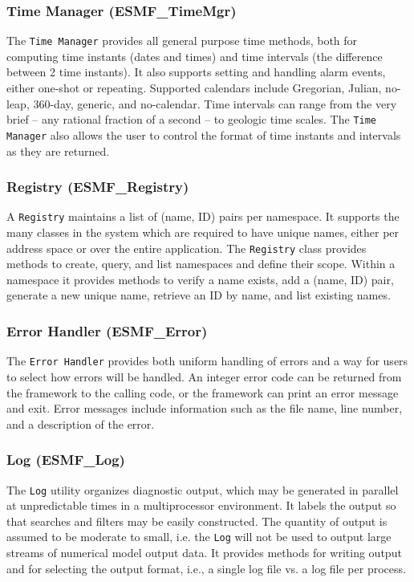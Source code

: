 \subsubsection{Time Manager (ESMF\_TimeMgr)}
\label{sec:timemgr} 
The {\tt Time Manager} provides all general purpose time methods, both
for computing time instants (dates and times) and time intervals
(the difference between 2 time instants).   It also supports 
setting and handling alarm events, either one-shot or repeating.
Supported calendars include Gregorian, Julian, no-leap, 360-day, 
generic, and no-calendar.
Time intervals can range from the very brief -- any rational fraction
of a second -- to geologic time scales.
The {\tt Time Manager} also allows the user to control the format of
time instants and intervals as they are returned.

\subsubsection{Registry (ESMF\_Registry)}
\label{sec:registry} 
A {\tt Registry} maintains a list of (name, ID) pairs per 
namespace.  It supports the many classes in the system which are
required to have unique names, either per address space or over the entire
application.  The {\tt Registry} class provides methods to
create, query, and list namespaces and define their scope.  
Within a namespace it provides methods to
verify a name exists, add a (name, ID) pair,
generate a new unique name, retrieve an ID by name, 
and list existing names.

\subsubsection{Error Handler (ESMF\_Error)}
\label{sec:error} 
The {\tt Error Handler} provides both uniform handling of errors and
a way for users to select how errors will be handled.
An integer error code can be returned from the framework to the
calling code, or the framework can print an error message and exit.
Error messages include information such as the file name, line number, 
and a description of the error.

\subsubsection{Log (ESMF\_Log)}
\label{sec:log} 
The {\tt Log} utility organizes diagnostic output, 
which may be generated in parallel at unpredictable times in
a multiprocessor environment.  It labels the output so that 
searches and filters may be easily constructed.  The quantity of
output is assumed to be moderate to small, i.e. the {\tt Log} 
will not be used to output large streams of numerical model output data.  
It provides methods for writing output and for selecting the
output format, i.e., a single log file vs. a log file per process.

